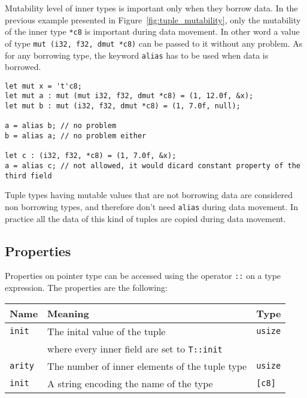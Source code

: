 

Mutability level of inner types is important only when they borrow data. In the
previous example presented in Figure~\ref{fig:tuple_mutability}, only the
mutability of the inner type \texttt{*c8} is important during data movement. In
other word a value of type \texttt{mut (i32, f32, dmut *c8)} can be passed to it
without any problem. As for any borrowing type, the keyword \texttt{alias} has
to be used when data is borrowed.

\begin{lstlisting}[style=coloredverbatim]
let mut x = 't'c8;
let mut a : mut (mut i32, f32, dmut *c8) = (1, 12.0f, &x);
let mut b : mut (i32, f32, dmut *c8) = (1, 7.0f, null);

a = alias b; // no problem
b = alias a; // no problem either

let c : (i32, f32, *c8) = (1, 7.0f, &x);
a = alias c; // not allowed, it would dicard constant property of the third field
\end{lstlisting}

Tuple types having mutable values that are not borrowing data are considered non
borrowing types, and therefore don't need \texttt{alias} during data movement.
In practice all the data of this kind of tuples are copied during data movement.

\subsection {Properties}

Properties on pointer type can be accessed using the operator \texttt{::} on a
type expression. The properties are the following:
\smallskip

\begin{center}
  \begin{adjustbox}{max width=\linewidth}
    \begin{tabular}{|l|ll|}
      \hline
      Name & Meaning & Type\\
      \hline
      \hline
      \texttt{init} & The inital value of the tuple & \texttt{usize} \\
      & where every inner field are set to \texttt{T::init} & \\
      \Xhline{0.001pt}
      \texttt{arity} & The number of inner elements of the tuple type & \texttt{usize}\\
      \hline
      \texttt{init} & A string encoding the name of the type & \texttt{[c8]} \\
      \hline
    \end{tabular}
  \end{adjustbox}
\end{center}

